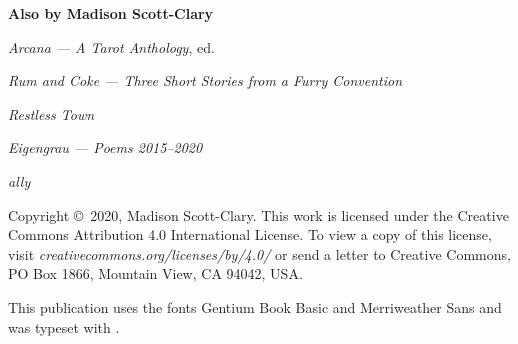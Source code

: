 
\thispagestyle{empty}
\null
\vfill
\begin{center}
    \noindent\textbf{Also by Madison Scott-Clary}

    \emph{Arcana --- A Tarot Anthology}, ed.

    \emph{Rum and Coke --- Three Short Stories from a Furry Convention}

    \emph{Restless Town}

    \emph{Eigengrau --- Poems 2015--2020}

    \emph{ally}
\end{center}
\vfill
\singlespacing
{\small\parindent0pt\parskip5pt
\noindent Copyright \copyright\ 2020, Madison Scott-Clary. This work is licensed under the Creative Commons Attribution 4.0 International License. To view a copy of this license, visit \mbox{\emph{creativecommons.org/licenses/by/4.0/}} or send a letter to Creative Commons, PO Box 1866, Mountain View, CA 94042, USA.

This publication uses the fonts Gentium Book Basic and  {\allyFont Merriweather Sans} and was typeset with {\XeLaTeX}.

\vspace{1ex}

\emph{\Title}
}

\cleardoublepage
